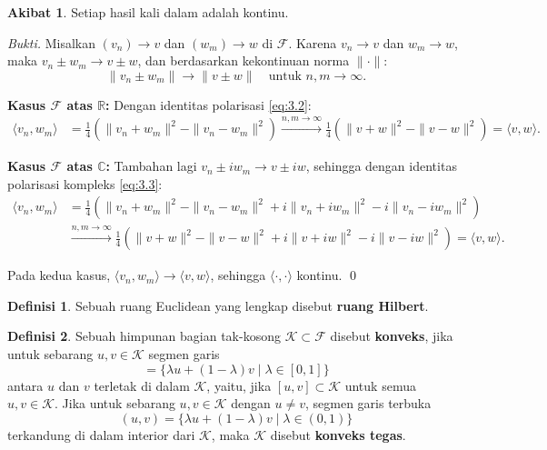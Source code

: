\documentclass[aspectratio=169,11pt]{beamer}
\theoremstyle{definition}
\newtheorem{definisi}{Definisi}
\newtheorem{akibat}{Akibat}
\newcommand{\R}{\mathbb{R}}
\newcommand{\C}{\mathbb{C}}
\begin{document}
\begin{frame}[allowframebreaks]{\insertsection}{\insertsubsection}
  \setcounter{akibat}{10}
  \begin{akibat}
    Setiap hasil kali dalam adalah kontinu.
  \end{akibat}
  \textit{Bukti.}
  Misalkan $(v_n) \to v$ dan $(w_m) \to w$ di $\mathcal{F}$. Karena $v_n \to v$ dan $w_m \to w$, maka $v_n \pm w_m \to v \pm w$, dan berdasarkan kekontinuan norma $\|\cdot\|$:
  \begin{equation*}
    \|v_n \pm w_m\| \to \|v \pm w\| \quad \text{untuk } n, m \to \infty.
  \end{equation*}

  \textbf{Kasus $\mathcal{F}$ atas $\R$:} Dengan identitas polarisasi \eqref{eq:3.2}:
  \begin{align*}
    \langle v_n, w_m \rangle & = \frac{1}{4}\left(\|v_n+w_m\|^2 - \|v_n-w_m\|^2\right)
    \xrightarrow{n,m\to\infty} \frac{1}{4}\left(\|v+w\|^2 - \|v-w\|^2\right) = \langle v, w \rangle.
  \end{align*}

  \textbf{Kasus $\mathcal{F}$ atas $\C$:} Tambahan lagi $v_n \pm iw_m \to v \pm iw$, sehingga dengan identitas polarisasi kompleks \eqref{eq:3.3}:
  \begin{align*}
    \langle v_n, w_m \rangle & = \frac{1}{4}\left(\|v_n+w_m\|^2 - \|v_n-w_m\|^2 + i\|v_n+iw_m\|^2 - i\|v_n-iw_m\|^2\right)                                  \\
                             & \xrightarrow{n,m\to\infty} \frac{1}{4}\left(\|v+w\|^2 - \|v-w\|^2 + i\|v+iw\|^2 - i\|v-iw\|^2\right) = \langle v, w \rangle.
  \end{align*}

  Pada kedua kasus, $\langle v_n, w_m \rangle \to \langle v, w \rangle$, sehingga $\langle \cdot, \cdot \rangle$ kontinu. \qed
\end{frame}

\begin{frame}[allowframebreaks]{\insertsection}
  \setcounter{definisi}{11}
  \begin{definisi}
    Sebuah ruang Euclidean yang lengkap disebut \textbf{ruang Hilbert}.
  \end{definisi}
  \begin{definisi}
    Sebuah himpunan bagian tak-kosong $\mathcal{K} \subset \mathcal{F}$ disebut \textbf{konveks}, jika untuk sebarang $u,v \in \mathcal{K}$ segmen garis
    \begin{equation*}
      [u,v] = \{ \lambda u + (1-\lambda)v \mid \lambda \in [0,1] \}
    \end{equation*}
    antara $u$ dan $v$ terletak di dalam $\mathcal{K}$, yaitu, jika $[u,v] \subset \mathcal{K}$ untuk semua $u,v \in \mathcal{K}$.
    Jika untuk sebarang $u,v \in \mathcal{K}$ dengan $u \neq v$, segmen garis terbuka
    \begin{equation*}
      (u,v) = \{ \lambda u + (1-\lambda)v \mid \lambda \in (0,1) \}
    \end{equation*}
    terkandung di dalam interior dari $\mathcal{K}$, maka $\mathcal{K}$ disebut \textbf{konveks tegas}.
  \end{definisi}
\end{frame}
\end{document}
